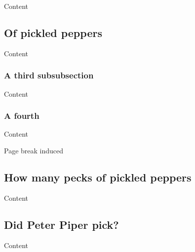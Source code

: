 \documentclass{article}
\begin{document}
Content

\subsection{Of pickled peppers}

Content

\subsubsection[\protect\miniorfulltoc{A \protect\emph{third} sub\protect\textcolor{blue}{sub}section \protect\textcolor{red}{$\Leftarrow$}\protect\mtocgobble}{}]{A third subsubsection}

Content

\subsubsection{A fourth}

Content

\vfill Page break induced
\newpage


\subsection[How many pecks]{How many pecks of pickled peppers}

Content

\subsection{Did Peter Piper pick?}

Content
\end{document}
